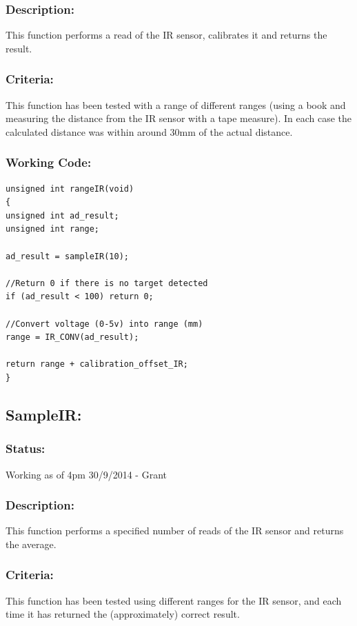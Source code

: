 \documentclass[]{report}
\begin{document}
\subsubsection{Description:}
This function performs a read of the IR sensor, calibrates it and returns the result.

\subsubsection{Criteria:}
This function has been tested with a range of different ranges (using a book and measuring the distance from the IR sensor with a tape measure). In each case the calculated distance was within around 30mm of the actual distance.

\subsubsection{Working Code:}
\begin{lstlisting}
unsigned int rangeIR(void)
{
unsigned int ad_result;
unsigned int range;

ad_result = sampleIR(10);

//Return 0 if there is no target detected
if (ad_result < 100) return 0;

//Convert voltage (0-5v) into range (mm)
range = IR_CONV(ad_result);

return range + calibration_offset_IR;
}
\end{lstlisting}

\subsection{SampleIR:}
\subsubsection{Status:}
Working as of 4pm 30/9/2014 - Grant

\subsubsection{Description:}
This function performs a specified number of reads of the IR sensor and returns the average.

\subsubsection{Criteria:}
This function has been tested using different ranges for the IR sensor, and each time it has returned the (approximately) correct result.
\end{document}
